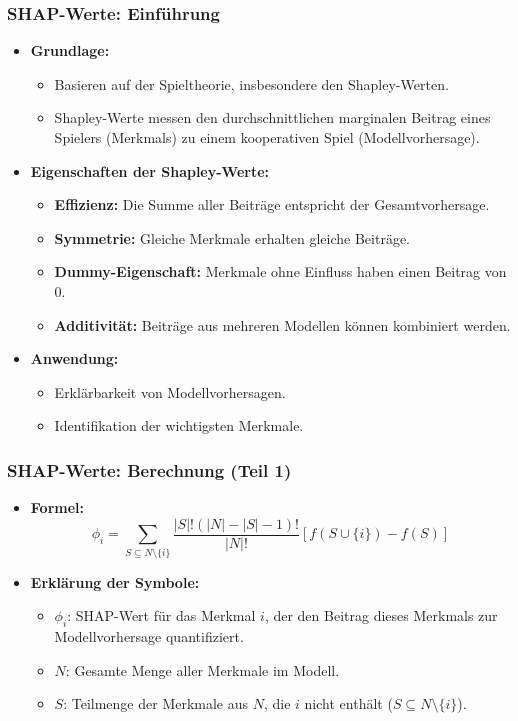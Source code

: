 \documentclass[aspectratio=1610, xcolor=dvipsnames, 9pt]{beamer}
\begin{document}
\begin{frame}
  \frametitle{SHAP-Werte: Einführung}
  \begin{itemize}
    \item \textbf{Grundlage:} 
    \begin{itemize}
      \item Basieren auf der Spieltheorie, insbesondere den Shapley-Werten.
      \item Shapley-Werte messen den durchschnittlichen marginalen Beitrag eines Spielers (Merkmals) zu einem kooperativen Spiel (Modellvorhersage).
    \end{itemize}
    \item \textbf{Eigenschaften der Shapley-Werte:}
    \begin{itemize}
      \item \textbf{Effizienz:} Die Summe aller Beiträge entspricht der Gesamtvorhersage.
      \item \textbf{Symmetrie:} Gleiche Merkmale erhalten gleiche Beiträge.
      \item \textbf{Dummy-Eigenschaft:} Merkmale ohne Einfluss haben einen Beitrag von 0.
      \item \textbf{Additivität:} Beiträge aus mehreren Modellen können kombiniert werden.
    \end{itemize}
    \item \textbf{Anwendung:}
    \begin{itemize}
      \item Erklärbarkeit von Modellvorhersagen.
      \item Identifikation der wichtigsten Merkmale.
    \end{itemize}
  \end{itemize}
\end{frame}

\begin{frame}
  \frametitle{SHAP-Werte: Berechnung (Teil 1)}
  \begin{itemize}
    \item \textbf{Formel:}
    \[
    \phi_i = \sum_{S \subseteq N \setminus \{i\}} \frac{|S|! (|N| - |S| - 1)!}{|N|!} \left[ f(S \cup \{i\}) - f(S) \right]
    \]
    \item \textbf{Erklärung der Symbole:}
    \begin{itemize}
      \item $\phi_i$: SHAP-Wert für das Merkmal $i$, der den Beitrag dieses Merkmals zur Modellvorhersage quantifiziert.
      \item $N$: Gesamte Menge aller Merkmale im Modell.
      \item $S$: Teilmenge der Merkmale aus $N$, die $i$ nicht enthält ($S \subseteq N \setminus \{i\}$).
    \end{itemize}
  \end{itemize}
\end{frame}
\end{document}
